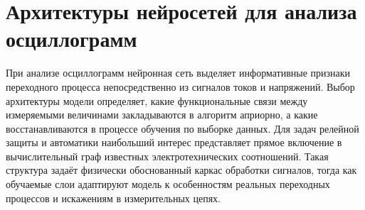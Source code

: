 \section{Архитектуры нейросетей для анализа осциллограмм}
\label{sec:ch4_physkan_architectures}

При анализе осциллограмм нейронная сеть выделяет информативные признаки
переходного процесса непосредственно из сигналов токов и напряжений.
Выбор архитектуры модели определяет, какие функциональные связи между
измеряемыми величинами закладываются в алгоритм априорно, а какие
восстанавливаются в процессе обучения по выборке данных. Для задач
релейной защиты и автоматики наибольший интерес представляет прямое
включение в вычислительный граф известных электротехнических
соотношений. Такая структура задаёт физически обоснованный каркас
обработки сигналов, тогда как обучаемые слои адаптируют модель к
особенностям реальных переходных процессов и искажениям в измерительных
цепях.

